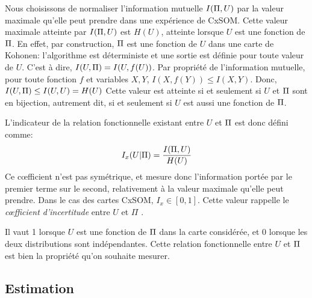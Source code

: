 Nous choisissons de normaliser l'information mutuelle $I(\Pi,U)$  par la valeur maximale qu'elle peut prendre dans une expérience de CxSOM. Cette valeur maximale atteinte par $I(\Pi,U)$ est $H(U)$, atteinte lorsque $U$ est une fonction de $\Pi$.
En effet, par construction, $\Pi$ est une fonction de $U$ dans une carte de Kohonen: l'algorithme est déterministe et une sortie est définie pour toute valeur de $U$. C'est à dire, $I(U,\Pi) = I (U, f(U))$.
Par propriété de l'information mutuelle, pour toute fonction $f$ et variables $X,Y$, $I(X,f(Y)) \leq I(X,Y) $. 
Donc, $I(U,\Pi) \leq I(U,U) = H(U)$
Cette valeur est atteinte si et seulement si $U$ et $\Pi$ sont en bijection, autrement dit, si et seulement si $U$ est aussi une fonction de $\Pi$.

L'indicateur de la relation fonctionnelle existant entre $U$ et $\Pi$  est donc défini comme:
\begin{equation}
I_x(U|\Pi) = \frac{I(\Pi,U)}{H(U)}
\end{equation}
Ce c\oe{}fficient n'est pas symétrique, et mesure donc l'information portée par le premier terme sur le second, relativement à la valeur maximale qu'elle peut prendre. Dans le cas des cartes CxSOM, $I_x \in [0,1]$. Cette valeur rappelle le \emph{c\oe{}fficient d'incertitude} entre $U$ et $\Pi$ \cite{Theil1961EconomicFA}.

Il vaut 1 lorsque $U$ est une fonction de $\Pi$ dans la carte considérée, et $0$ lorsque les deux distributions sont indépendantes. Cette relation fonctionnelle entre $U$ et $\Pi$ est bien la propriété qu'on souhaite mesurer.


\subsection{Estimation}

